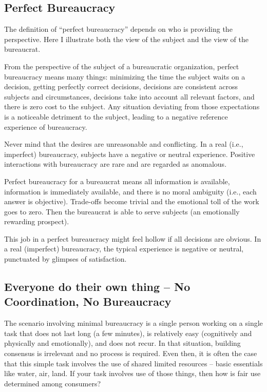 \subsection*{Perfect Bureaucracy}

The definition of ``perfect bureaucracy'' depends on who is providing the perspective. Here I illustrate both the view of the subject and the view of the bureaucrat. 

From the perspective of the subject of a bureaucratic organization, perfect bureaucracy means many things: minimizing the time the subject waits on a decision, getting perfectly correct decisions, decisions are consistent across subjects and circumstances, decisions take into account all relevant factors, and there is zero cost to the subject. Any situation deviating from those expectations is a noticeable detriment to the subject, leading to a negative reference experience of bureaucracy. 

Never mind that the desires are unreasonable and conflicting. In a real (i.e., imperfect) bureaucracy, subjects have a negative or neutral experience. Positive interactions with bureaucracy are rare and are regarded as anomalous.

Perfect bureaucracy for a bureaucrat means all information is available, information is immediately available, and there is no moral ambiguity (i.e., each answer is objective). Trade-offs become trivial and the emotional toll of the work goes to zero. Then the bureaucrat is able to serve subjects (an emotionally rewarding prospect). 

This job in a perfect bureaucracy might feel hollow if all decisions are obvious. In a real (imperfect) bureaucracy, the typical experience is negative or neutral, punctuated by glimpses of satisfaction. 

\subsection*{Everyone do their own thing -- No Coordination, No Bureaucracy}
The scenario involving minimal bureaucracy is a single person working on a single task that does not last long (a few minutes), is relatively easy (cognitively and physically and emotionally), and does not recur. In that situation, building consensus is irrelevant and no process is required. Even then, it is often the case that this simple task involves the use of shared limited resources -- basic essentials like water, air, land. If your task involves use of those things, then how is fair use determined among consumers?

